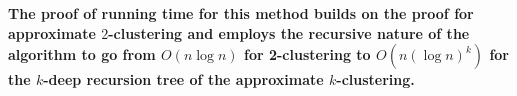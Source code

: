 \begin{remark}
\textbf{The proof of running time for this method builds on the proof for approximate $2$-clustering and employs the recursive nature of the algorithm to go from $O(n \log n)$ for 2-clustering to $O(n (\log n)^k)$ for the $k$-deep recursion tree of the approximate $k$-clustering.}
\end{remark}

